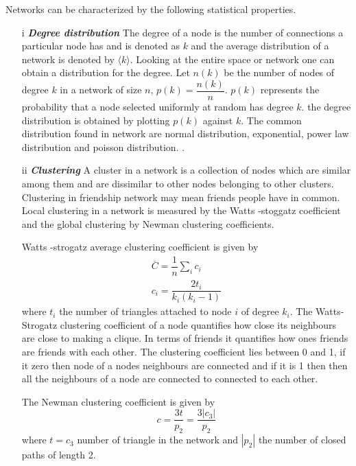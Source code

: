  Networks can be characterized by the following statistical properties.
 \begin{itemize}
 \item[i] \textit{\textbf{Degree distribution}}
 The degree of a node is the number of connections a particular node has  and is denoted as $k$  and the average distribution of a network is denoted by $\langle k \rangle$. 
Looking at the entire space or network one can obtain a distribution for the degree. Let $n(k)$ be the number of nodes of degree $k$  in a network of size $n$, $p(k) = \dfrac{n(k)}{n}$. $p(k)$ represents the probability that a node selected uniformly at random  has degree $k$. the degree distribution is obtained by plotting $p(k)$ against $k$\citep{estrada2015first}. The common distribution found in network are normal distribution, exponential, power law distribution and poisson distribution.
   \citep{chung2002average}.
   
 \item[ii] \textit{\textbf{Clustering }}
 A cluster in a network  is a collection of nodes which are similar among them and are dissimilar to other nodes belonging to other clusters. Clustering in friendship network may mean friends people have in common. Local clustering in a network is measured by   the Watts -stoggatz  coefficient and the global clustering by  Newman clustering coefficients.
 
 Watts -strogatz average clustering coefficient is given by 
 \begin{align}
 \overline{C} = \dfrac{1}{n} \sum_i c_i
  \\ c_i = \dfrac{2t_i}{k_i(k_i-1)} \nonumber
  \end{align}
   where $t_i $ the  number of triangles attached to node $i$ of degree $k_i$. The Watts-Strogatz clustering coefficient of a node quantifies how close its neighbours are close to making a clique. In terms of friends it quantifies how ones friends are friends with each other. The clustering coefficient  lies between 0 and 1, if it zero then node of a nodes neighbours are connected and  if it is 1 then then all the neighbours of a node are connected to connected to each other.
  

 The Newman clustering coefficient is given by
 \begin{equation}
 c = \frac{3t}{p_2} =\dfrac{3|c_3|}{p_2}
 \end{equation}
 where $t = c_3$ number of triangle in the network and $|p_2|$ the number of closed paths of length 2. 
\end{itemize}

